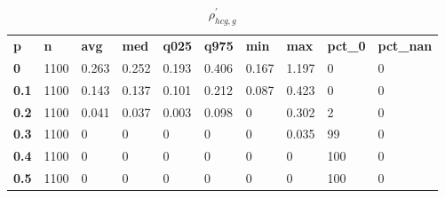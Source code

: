 \begin{table}[h]
 \centering 
\footnotesize
\caption{$\rho_{hcg,g}^\prime $}
\label{tab:alphahcgg}
\begin{tabular}[h]{| l l l l l l l l l l|
    } \hline
\textbf{ p} & \textbf{ n} & \textbf{ avg} & \textbf{ med} & \textbf{ q025} & \textbf{ q975} & \textbf{ min} & \textbf{ max} & \textbf{ pct\_0} & \textbf{ pct\_nan}
           \\
  \textbf{  0} & 1100 & 0.263 & 0.252 & 0.193 & 0.406 & 0.167 & 1.197 &   0 & 0
           \\
  \textbf{0.1} & 1100 & 0.143 & 0.137 & 0.101 & 0.212 & 0.087 & 0.423 &   0 & 0
           \\
  \textbf{0.2} & 1100 & 0.041 & 0.037 & 0.003 & 0.098 &     0 & 0.302 &   2 & 0
           \\
  \textbf{0.3} & 1100 &     0 &     0 &     0 &     0 &     0 & 0.035 &  99 & 0
           \\
  \textbf{0.4} & 1100 &     0 &     0 &     0 &     0 &     0 &     0 & 100 & 0
           \\
  \textbf{0.5} & 1100 &     0 &     0 &     0 &     0 &     0 &     0 & 100 & 0
           \\
 \hline \end{tabular}
 \end{table}
